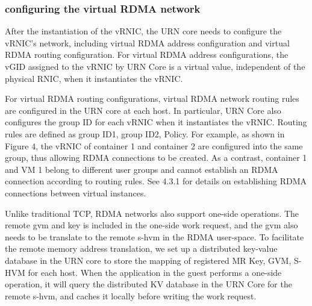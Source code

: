 \subsubsection{configuring the virtual RDMA network}

After the instantiation of the vRNIC, the URN core needs to configure the vRNIC's network, including virtual RDMA address configuration and virtual RDMA routing configuration.
For virtual RDMA address configurations, the vGID assigned to the vRNIC by URN Core is a virtual value, independent of the physical RNIC, when it instantiates the vRNIC.


For virtual RDMA routing configurations, virtual RDMA network routing rules are configured in the URN core at each host. In particular, URN Core also configures the group ID for each vRNIC when it instantiates the vRNIC. Routing rules are defined as {group ID1, group ID2, Policy}. For example, as shown in Figure 4, the vRNIC of container 1 and container 2 are configured into the same group, thus allowing RDMA connections to be created. As a contrast, container 1 and VM 1 belong to different user groups and cannot establish an RDMA connection according to routing rules. See 4.3.1 for details on establishing RDMA connections between virtual instances.

Unlike traditional TCP, RDMA networks also support one-side operations. The remote gvm and key is included in the one-side work request, and the gvm also needs to be translate to the remote s-hvm in the RDMA user-space. To facilitate the remote memory address translation, we set up a distributed key-value database in the URN core to store the mapping of registered MR {Key, GVM, S-HVM} for each host. When the application in the guest performs a one-side operation, it will query the distributed KV database in the URN Core for the remote s-hvm, and caches it locally before writing the work request.

